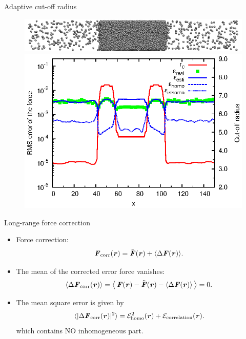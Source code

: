 \documentclass{beamer}
\newcommand{\redc}[1]{{\color{red} #1}}
\newcommand{\bluec}[1]{{\color{blue} #1}}
\renewcommand{\v}[1]{\textbf{\textit{#1}}}
\begin{document}
\begin{frame}{Adaptive cut-off radius}
  \begin{figure}
    \centering
    \includegraphics[scale=1]{figs/t0.85-n16000-rc07.5uni/confout-02.eps}\\
    \includegraphics[]{figs/t0.85-n16000-adapt-e0.0045-extend/rcut-and-error.eps}
  \end{figure}
\end{frame}

\begin{frame}{Long-range force correction}
  \begin{itemize}\itemsep -10pt
  \item<1->   Force correction:
  \bluec{
\begin{align*}
  \v F_{\textrm{corr}}(\v r) = \tilde{\v F}(\v r) + \langle\Delta\v F(\v r)\rangle.
\end{align*}}
\item<2->   The mean of
  the corrected error force vanishes:
  \bluec{
\begin{align*}
  \langle\Delta\v F_{\textrm{corr}}(\v r)\rangle
   =
  \big\langle\,
  \v F(\v r) - \tilde{\v F}(\v r) - \langle\Delta\v F(\v r)\rangle\,
  \big\rangle = 0.
\end{align*}}
\item<3-> The mean square error is given by
\bluec{
\begin{align*} \nonumber
  \langle\vert\Delta\v F_{\textrm{corr}}(\v r)\vert^2\rangle
   =
  \mathcal E^2_{\textrm{homo}}(\v r) +
  \mathcal E_{\textrm{correlation}}(\v r).
\end{align*}}
which contains \redc{NO} inhomogeneous part.
  \end{itemize}
\end{frame}
\end{document}
